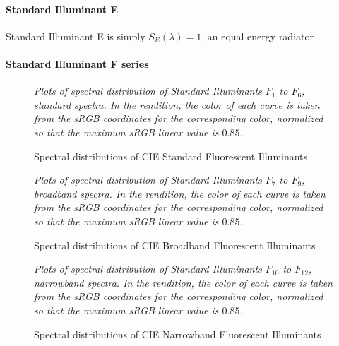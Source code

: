 \paragraph{Standard Illuminant E}

Standard Illuminant E is simply $S_E(\lambda) = 1$, an equal energy radiator

\paragraph{Standard Illuminant F series}

\begin{figure}
\small
\centering
{}
\caption{Spectral distributions of CIE Standard Fluorescent Illuminants}
\label{fig:illumfspectrastd}
\vskip 1mm
{\footnotesize\it Plots of spectral distribution of
Standard Illuminants $F_1$ to $F_6$, standard spectra.
In the rendition, the color of each curve is taken from the
sRGB coordinates for the corresponding color,
normalized so that the maximum sRGB linear value is $0.85$.
}
\end{figure}

\begin{figure}
{
\small
\centering
{}
\caption{Spectral distributions of CIE Broadband Fluorescent Illuminants}
\label{fig:illumfspectrabroad}
}
\vskip 1mm
{\footnotesize\it Plots of spectral distribution of
Standard Illuminants $F_7$ to $F_9$, broadband spectra.
In the rendition, the color of each curve is taken from the
sRGB coordinates for the corresponding color,
normalized so that the maximum sRGB linear value is $0.85$.
}
\end{figure}

\begin{figure}
{
\small
\centering
{}
\caption{Spectral distributions of CIE Narrowband Fluorescent Illuminants}
\label{fig:illumfspectranarrow}
}
\vskip 1mm
{\footnotesize\it Plots of spectral distribution of
Standard Illuminants $F_{10}$ to $F_{12}$, narrowband spectra.
In the rendition, the color of each curve is taken from the
sRGB coordinates for the corresponding color,
normalized so that the maximum sRGB linear value is $0.85$.
}
\end{figure}

